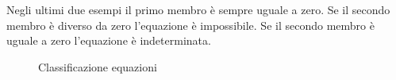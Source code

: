 Negli ultimi due esempi il primo membro è sempre uguale a zero. Se il secondo membro è diverso da zero l'equazione è impossibile. Se il secondo membro è uguale a zero l'equazione è indeterminata.
\begin{figure}
		\centering

	\caption[]{Classificazione equazioni}
	\label{fig:AlberoBinarioeqa1}
\end{figure}
%
